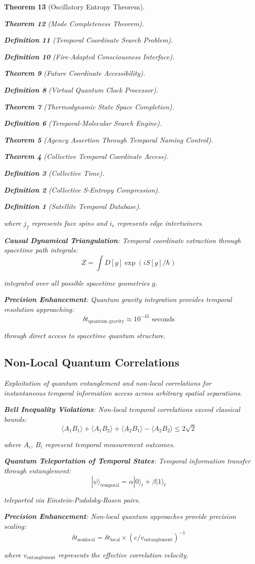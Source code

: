 \documentclass[12pt,a4paper]{article}
\newtheorem{theorem}{Theorem}[section]
\newtheorem{definition}[theorem]{Definition}
\begin{document}
\begin{theorem}[Oscillatory Entropy Theorem]
\begin{theorem}[Mode Completeness Theorem]
\begin{enumerate}
\begin{definition}[Temporal Coordinate Search Problem]
\begin{algorithm}
\begin{definition}[Fire-Adapted Consciousness Interface]
\begin{theorem}[Future Coordinate Accessibility]
\begin{definition}[Virtual Quantum Clock Processor]
\begin{itemize}
\begin{itemize}
\begin{theorem}[Thermodynamic State Space Completion]
\begin{definition}[Temporal-Molecular Search Engine]
\begin{theorem}[Agency Assertion Through Temporal Naming Control]
\begin{remark}
\begin{theorem}[Collective Temporal Coordinate Access]
\begin{definition}[Collective Time]
\begin{definition}[Collective S-Entropy Compression]
\begin{definition}[Satellite Temporal Database]
\begin{algorithm}
\begin{table}[h]
{where $j_f$ represents face spins and $i_e$ represents edge intertwiners.

\textbf{Causal Dynamical Triangulation}: Temporal coordinate extraction through spacetime path integrals:
$$Z = \int D[g] \exp(iS[g]/\hbar)$$

integrated over all possible spacetime geometries $g$.

\textbf{Precision Enhancement}: Quantum gravity integration provides temporal resolution approaching:
$$\delta t_{\text{quantum gravity}} \approx 10^{-45} \text{ seconds}$$

through direct access to spacetime quantum structure.

\subsection{Non-Local Quantum Correlations}

Exploitation of quantum entanglement and non-local correlations for instantaneous temporal information access across arbitrary spatial separations.

\textbf{Bell Inequality Violations}: Non-local temporal correlations exceed classical bounds:
$$\langle A_1 B_1 \rangle + \langle A_1 B_2 \rangle + \langle A_2 B_1 \rangle - \langle A_2 B_2 \rangle \leq 2\sqrt{2}$$

where $A_i$, $B_i$ represent temporal measurement outcomes.

\textbf{Quantum Teleportation of Temporal States}: Temporal information transfer through entanglement:
$$|\psi\rangle_{\text{temporal}} = \alpha|0\rangle_t + \beta|1\rangle_t$$

teleported via Einstein-Podolsky-Rosen pairs.

\textbf{Precision Enhancement}: Non-local quantum approaches provide precision scaling:
$$\delta t_{\text{nonlocal}} = \delta t_{\text{local}} \times (c/v_{\text{entanglement}})^{-1}$$

where $v_{\text{entanglement}}$ represents the effective correlation velocity.

}
\end{table}
\end{algorithm}
\end{definition}
\end{definition}
\end{definition}
\end{theorem}
\end{remark}
\end{theorem}
\end{definition}
\end{theorem}
\end{itemize}
\end{itemize}
\end{definition}
\end{theorem}
\end{definition}
\end{algorithm}
\end{definition}
\end{enumerate}
\end{theorem}
\end{theorem}
\end{document}
